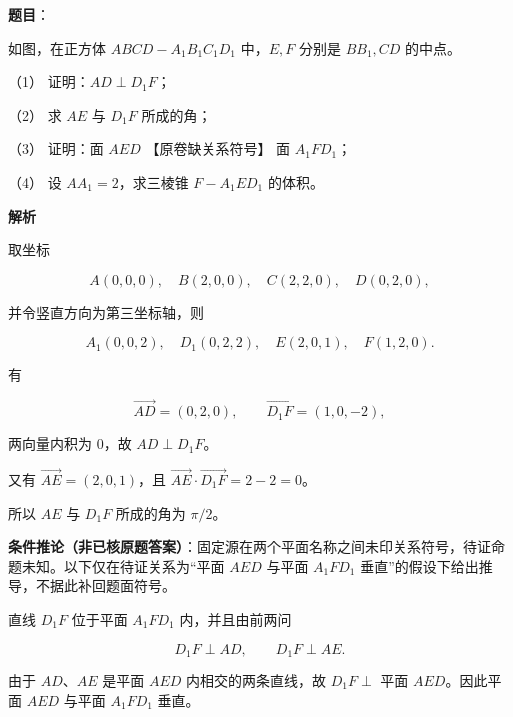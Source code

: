 \begin{answer}

\textbf{题目}：

如图，在正方体 $ABCD-A_1B_1C_1D_1$ 中，$E,F$ 分别是 $BB_1,CD$ 的中点。

（1） 证明：$AD\perp D_1F$；

（2） 求 $AE$ 与 $D_1F$ 所成的角；

（3） 证明：面 $AED$ 【原卷缺关系符号】 面 $A_1FD_1$；

（4） 设 $AA_1=2$，求三棱锥 $F-A_1ED_1$ 的体积。
\nopagebreak[4]
\begin{center}\end{center}
\nopagebreak[4]
\textbf{解析}

取坐标

\nopagebreak[4]
\[
A(0,0,0),\quad B(2,0,0),\quad C(2,2,0),\quad D(0,2,0),
\]

并令竖直方向为第三坐标轴，则

\nopagebreak[4]
\[
A_1(0,0,2),\quad D_1(0,2,2),\quad E(2,0,1),\quad F(1,2,0).
\]


有

\nopagebreak[4]
\[
\overrightarrow{AD}=(0,2,0),
\qquad
\overrightarrow{D_1F}=(1,0,-2),
\]

两向量内积为 $0$，故 $AD\perp D_1F$。


又有 $\overrightarrow{AE}=(2,0,1)$，且 $\overrightarrow{AE}\cdot\overrightarrow{D_1F}=2-2=0$。

所以 $AE$ 与 $D_1F$ 所成的角为 $\pi/2$。


\begin{gktip}
\textbf{条件推论（非已核原题答案）}：固定源在两个平面名称之间未印关系符号，待证命题未知。以下仅在待证关系为“平面 $AED$ 与平面 $A_1FD_1$ 垂直”的假设下给出推导，不据此补回题面符号。
\end{gktip}

直线 $D_1F$ 位于平面 $A_1FD_1$ 内，并且由前两问

\nopagebreak[4]
\[
D_1F\perp AD,\qquad D_1F\perp AE.
\]

由于 $AD$、$AE$ 是平面 $AED$ 内相交的两条直线，故 $D_1F\perp$ 平面 $AED$。因此平面 $AED$ 与平面 $A_1FD_1$ 垂直。


\end{answer}
